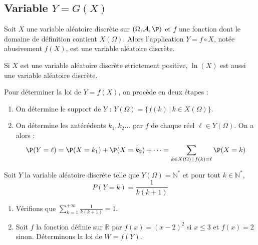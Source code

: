 \documentclass[french,11pt,twoside]{VcCours}
\begin{document}
\subsection{Variable \texorpdfstring{$Y=G(X)$}{Y=G(X)}}
\begin{Proposition}{}
Soit $X$ une variable aléatoire discrète sur $(\Omega, \mathcal{A}, \P)$ et $f$ une fonction dont le domaine de définition contient $X(\Omega)$. Alors l'application $Y=f \circ X$, notée abusivement $f(X)$, est une variable aléatoire discrète.
\end{Proposition}

\begin{Exemple}{} Si $X$ est une variable aléatoire discrète strictement positive, $\ln(X)$ est aussi une variable aléatoire discrète.
\end{Exemple}

\begin{Methode}{}
Pour déterminer la loi de $Y=f(X)$, on procède en deux étapes : 
\begin{enumerate}
\item On détermine le support de $Y$ : $Y(\Omega) = \lbrace f(k) \, \vert \, k \in X(\Omega) \rbrace.$
\item  On détermine les antécédents $k_1,k_2\dots$ par $f$ de chaque réel $ \ell \in Y(\Omega)$. On a alors :  \[ \P(Y=\ell)=\P(X=k_1)+\P(X=k_2)+\cdots = \sum_{k \in X(\Omega) \, \vert \, f(k)= \ell} \P(X=k) \]
\end{enumerate}
\end{Methode}


\begin{Exemple}{}\label{ex2.6}
Soit $Y$ la variable aléatoire discrète telle que $Y(\Omega) = \mathbb{N}^*$ et pour tout $k \in \mathbb{N}^*$,
\[ P(Y=k)= \frac{1}{k(k+1)} \]
\begin{enumerate}
\item Vérifions que $\sum_{k=1}^{+ \infty} \frac{1}{k(k+1)} = 1$.

\vspace*{3cm}

\item Soit $f$ la fonction définie sur $\mathbb{R}$ par $f(x) = (x-2)^2$ si $x \leq 3$ et $f(x)=2$ sinon. Déterminons la loi de $W=f(Y)$.

\vspace*{7cm}
\end{enumerate}
\end{Exemple}
\end{document}
